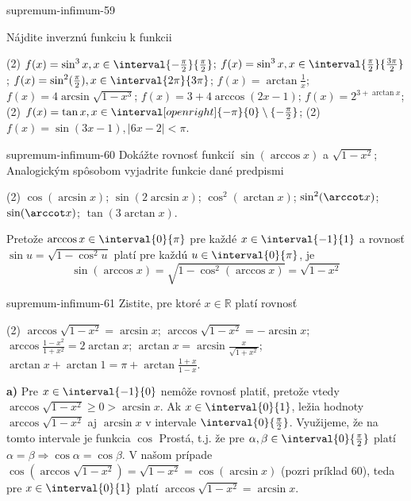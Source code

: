 \begin{defproblem}{supremum-infimum-59}
\begin{samepage}
Nájdite inverznú funkciu k funkcii
\begin{tasks}(2)
  \task $f(x)=\sin^3 x, x \in \interval{-\frac{\pi}{2}}{\frac{\pi}{2}}$;
  \task $f(x)=\sin^3 x, x \in \interval{\frac{\pi}{2}}{\frac{3\pi}{2}}$;
  \task $f(x)=\sin^2 (\frac{\pi}{2}),x \in \interval{2\pi}{3\pi}$;
  \task $f(x)=\arctan\frac{1}{x}$;
  \task $f(x)=4\arcsin\sqrt{1-x^3}$;
  \task $f(x)=3+4\arccos(2x-1)$;
  \task $f(x)=2^{3+\arctan x}$;
  \startnewitemline
  \task*(2) $f(x)=\tan{x},
    x \in \interval[open right]{-\pi}{0} \setminus \{-\frac{\pi}{2}\}
  $;
  \task*(2) $f(x)=\sin{(3x-1)}, |6x-2| < \pi$.
\end{tasks}
\end{samepage}
\end{defproblem}

\begin{defproblem}{supremum-infimum-60}
Dokážte rovnosť funkcií $\sin(\arccos x)$ a $\sqrt{1-x^2}$; Analogickým spôsobom
vyjadrite funkcie dané predpismi
\begin{tasks}(2)
  \task $\cos(\arcsin x)$;
  \task $\sin(2\arcsin x)$;
  \task $\cos^2 (\arctan x)$;
  \task $\sin^2 (\arccot x)$;
  \task $\sin (\arccot x)$;
  \task $\tan (3\arctan x)$.
\end{tasks}

\begin{solution}
  Pretože $\arccos x \in \interval{0}{\pi}$ pre každé $x \in \interval{-1}{1}$ a
  rovnosť $\sin u=\sqrt{1-\cos^2 u}$ platí pre každú $u \in \interval{0}{\pi}$,
  je
  \[\sin(\arccos x) = \sqrt{1-\cos^2(\arccos x)} = \sqrt{1-x^2}\]
\end{solution}
\end{defproblem}

\begin{defproblem}{supremum-infimum-61}
Zistite, pre ktoré $x\in\mathbb{R}$ platí rovnosť
\begin{tasks}(2)
  \task $\arccos\sqrt{1-x^2}=\arcsin x$;
  \task $\arccos\sqrt{1-x^2}=-\arcsin x$;
  \task $\arccos\frac{1-x^2}{1+x^2}=2\arctan x$;
  \task $\arctan x=\arcsin\frac{x}{\sqrt{1+x^2}}$;
  \task $\arctan x +\arctan 1 =\pi+ \arctan\frac{1+x}{1-x}$.
\end{tasks}

\begin{solution}
  \textbf{a)}
  Pre $x \in \interval{-1}{0}$ nemôže rovnosť platiť, pretože vtedy
  $\arccos\sqrt{1-x^2} \geq 0 > \arcsin{x}$. Ak $x \in \interval{0}{1}$, ležia
  hodnoty $\arccos{\sqrt{1-x^2}}$ aj $\arcsin{x}$ v intervale
  $\interval{0}{\frac{\pi}{2}}$. Využijeme, že na tomto intervale je funkcia
  $\cos$ Prostá, t.j. že pre $\alpha,\beta \in \interval{0}{\frac{\pi}{2}}$
  platí $\alpha = \beta \Rightarrow \cos{\alpha} = \cos{\beta}.$ V našom prípade
  $\cos(\arccos\sqrt{1-x^2})=\sqrt{1-x^2}=\cos(\arcsin x)$ (pozri príklad $60$),
  teda pre $x \in \interval{0}{1}$ platí $\arccos{\sqrt{1-x^2}}=\arcsin x$.
\end{solution}
\end{defproblem}

